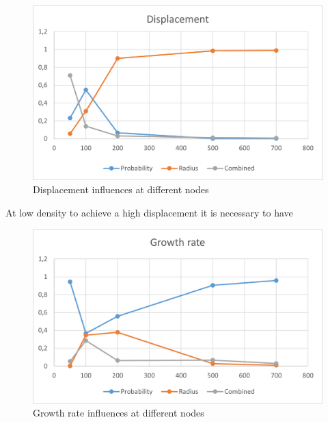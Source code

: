 \begin{figure}[H]\label{pic:test}
\centering
    \includegraphics[width= 1\textwidth]{./images/DisplacementWithNodes.png}
    \caption{Displacement influences at different nodes}
    \label{fig:immagine}
\end{figure}

At low density to achieve a high displacement it is necessary to have  

\begin{figure}[H]\label{pic:test}
\centering
    \includegraphics[width= 1\textwidth]{./images/GrowthRateWithNodes.png}
    \caption{Growth rate influences at different nodes}
    \label{fig:immagine}
\end{figure}
